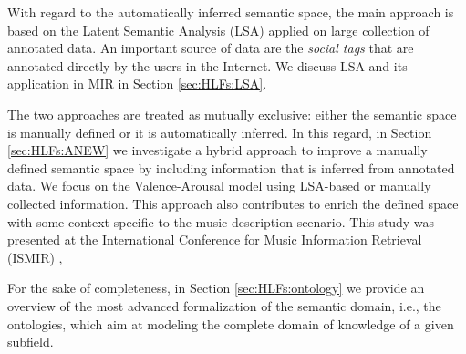With regard to the automatically inferred semantic space, the main approach is based on the Latent Semantic Analysis (LSA) applied on large collection of annotated data.
An important source of data are the \textit{social tags} that are annotated directly by the users in the Internet. We discuss LSA and its application in MIR in Section \ref{sec:HLFs:LSA}.

The two approaches are treated as mutually exclusive: either the semantic space is manually defined or it is automatically inferred. In this regard, in Section \ref{sec:HLFs:ANEW} we investigate a hybrid approach to improve a manually defined semantic space by including information that is inferred from annotated data. We focus on the Valence-Arousal model using LSA-based or manually collected information. This approach also contributes to enrich the defined space with some context specific to the music description scenario. This study was presented at the International Conference for Music Information Retrieval (ISMIR) \cite{Buccoli2016AHE},

For the sake of completeness, in Section \ref{sec:HLFs:ontology} we provide an overview of the most advanced formalization of the semantic domain, i.e., the ontologies, which aim at modeling the complete domain of knowledge of a given subfield.%

%
%
%
%
%
%



